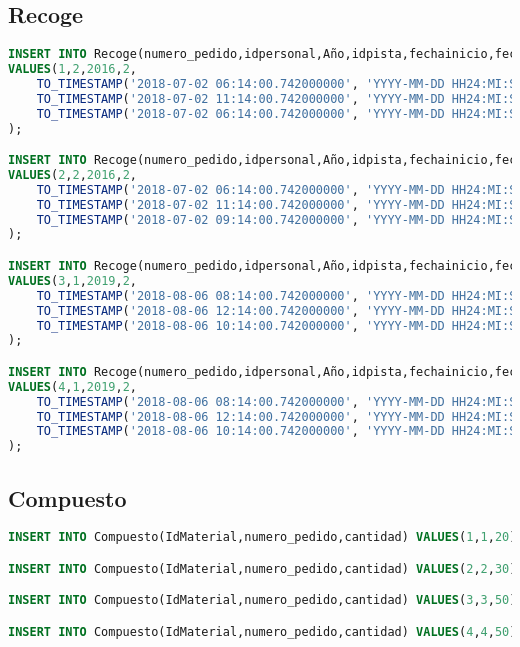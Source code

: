 \subsection{Recoge}
\begin{lstlisting}[language=sql]
INSERT INTO Recoge(numero_pedido,idpersonal,Año,idpista,fechainicio,fechafin,fecha)
VALUES(1,2,2016,2,
	TO_TIMESTAMP('2018-07-02 06:14:00.742000000', 'YYYY-MM-DD HH24:MI:SS.FF'),
	TO_TIMESTAMP('2018-07-02 11:14:00.742000000', 'YYYY-MM-DD HH24:MI:SS.FF'),
	TO_TIMESTAMP('2018-07-02 06:14:00.742000000', 'YYYY-MM-DD HH24:MI:SS.FF')
);

INSERT INTO Recoge(numero_pedido,idpersonal,Año,idpista,fechainicio,fechafin,fecha)
VALUES(2,2,2016,2,
	TO_TIMESTAMP('2018-07-02 06:14:00.742000000', 'YYYY-MM-DD HH24:MI:SS.FF'),
	TO_TIMESTAMP('2018-07-02 11:14:00.742000000', 'YYYY-MM-DD HH24:MI:SS.FF'),
	TO_TIMESTAMP('2018-07-02 09:14:00.742000000', 'YYYY-MM-DD HH24:MI:SS.FF')
);

INSERT INTO Recoge(numero_pedido,idpersonal,Año,idpista,fechainicio,fechafin,fecha)
VALUES(3,1,2019,2,
	TO_TIMESTAMP('2018-08-06 08:14:00.742000000', 'YYYY-MM-DD HH24:MI:SS.FF'),
	TO_TIMESTAMP('2018-08-06 12:14:00.742000000', 'YYYY-MM-DD HH24:MI:SS.FF'),
	TO_TIMESTAMP('2018-08-06 10:14:00.742000000', 'YYYY-MM-DD HH24:MI:SS.FF')
);

INSERT INTO Recoge(numero_pedido,idpersonal,Año,idpista,fechainicio,fechafin,fecha)
VALUES(4,1,2019,2,
	TO_TIMESTAMP('2018-08-06 08:14:00.742000000', 'YYYY-MM-DD HH24:MI:SS.FF'),
	TO_TIMESTAMP('2018-08-06 12:14:00.742000000', 'YYYY-MM-DD HH24:MI:SS.FF'),
	TO_TIMESTAMP('2018-08-06 10:14:00.742000000', 'YYYY-MM-DD HH24:MI:SS.FF')
);

\end{lstlisting}

\subsection{Compuesto}
\begin{lstlisting}[language=sql]
INSERT INTO Compuesto(IdMaterial,numero_pedido,cantidad) VALUES(1,1,20);

INSERT INTO Compuesto(IdMaterial,numero_pedido,cantidad) VALUES(2,2,30);

INSERT INTO Compuesto(IdMaterial,numero_pedido,cantidad) VALUES(3,3,50);

INSERT INTO Compuesto(IdMaterial,numero_pedido,cantidad) VALUES(4,4,50);
\end{lstlisting}
